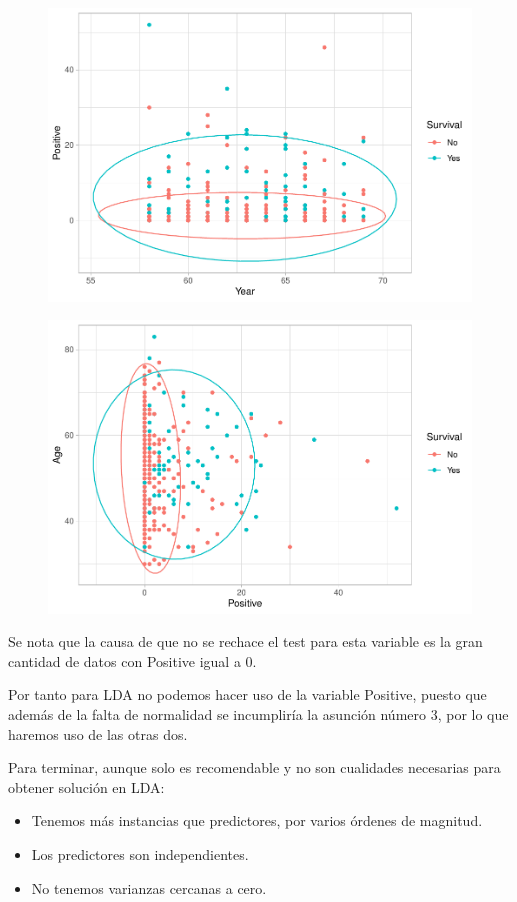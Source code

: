 \begin{figure}[H]\center\includegraphics[width=.8\linewidth]{img/Clasificacion_files/figure-latex/unnamed-chunk-18-2}\caption{}\end{figure}

\begin{figure}[H]\center\includegraphics[width=.8\linewidth]{img/Clasificacion_files/figure-latex/unnamed-chunk-18-3}\caption{}\end{figure}

Se nota que la causa de que no se rechace el test para esta variable es la gran cantidad de datos con Positive igual a 0.

\vspace{\baselineskip}

Por tanto para LDA no podemos hacer uso de la variable Positive, puesto que además de la falta de normalidad se incumpliría la asunción número 3, por lo que haremos uso de las otras dos.

\vspace{\baselineskip}

Para terminar, aunque solo es recomendable y no son cualidades necesarias para obtener solución en LDA:
\begin{itemize}
    \item Tenemos más instancias que predictores, por varios órdenes de magnitud.
    \item Los predictores son independientes. 
    \item No tenemos varianzas cercanas a cero.
\end{itemize}

